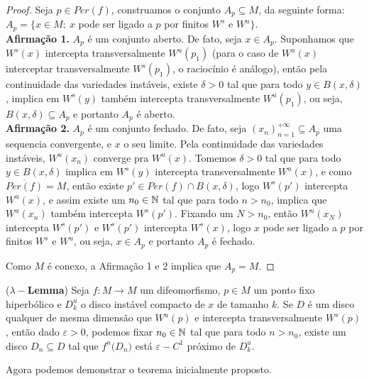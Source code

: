 \begin{proof} Seja $p\in Per(f)$, construamos o conjunto $A_p\subseteq M$, da seguinte forma: $A_p=\big\{x\in M;\ x$ pode ser ligado a $p$ por finitos $W^s$ e $W^u\big\}$.\\
\textbf{Afirmação 1.} $A_p$ é um conjunto aberto. De fato, seja $x\in A_p$. Suponhamos que $W^s(x)$ intercepta transversalmente $W^u(p_1)$ (para o caso de $W^u(x)$ interceptar transversalmente $W^s(p_1)$, o raciocínio é análogo), então pela continuidade das variedades instáveis, existe $\delta>0$ tal que para todo $y\in B(x,\delta)$, implica em $W^s(y)$ também intercepta transversalmente $W^u(p_1)$, ou seja, $B(x,\delta)\subseteq A_p$ e portanto $A_p$ é aberto.\\
\textbf{Afirmação 2.} $A_p$ é um conjunto fechado. De fato, seja $(x_n)_{n=1}^{+\infty}\subseteq A_p$ uma sequencia convergente, e $x$ o seu limite. Pela continuidade das variedades instáveis, $W^u(x_n)$ converge pra $W^u(x)$. Tomemos $\delta>0$ tal que para todo $y\in B(x,\delta)$ implica em $W^s(y)$ intercepta transversalmente $W^u(x)$, e como $\overline{Per(f)}=M$, então existe $p'\in Per(f)\cap B(x,\delta)$, logo $W^s(p')$ intercepta $W^u(x)$, e assim existe um $n_0\in\mathbb{N}$  tal que para todo $n>n_0$, implica que $W^u(x_n)$ também intercepta $W^s(p')$. Fixando um $N>n_0$, então $W^u(x_N)$ intercepta $W^s(p')$ e $W^s(p')$ intercepta $W^s(x)$, logo $x$ pode ser ligado a $p$ por finitos $W^s$ e $W^u$, ou seja, $x\in A_p$ e portanto $A_p$ é fechado.

Como $M$ é conexo, a Afirmação 1 e 2 implica que $A_p=M$.
\end{proof}

\begin{lema}\label{lambdalema}(\textbf{$\lambda-$Lemma}) Seja $f:M\to M$ um difeomorfismo, $p\in M$ um ponto fixo hiperbólico e $D^{u}_k$ o disco instável compacto de $x$ de tamanho $k$. Se $D$ é um disco qualquer de mesma dimensão que $W^u(p)$ e intercepta transversalmente $W^s(p)$, então dado $\varepsilon>0$, podemos fixar $n_0\in\mathbb{N}$ tal que para todo $n>n_0$, existe um disco $D_n\subseteq D$ tal que $f^n\big(D_n\big)$ está $\varepsilon-C^1$ próximo de $D^u_k$.	
\end{lema}

Agora podemos demonstrar o teorema inicialmente proposto.

